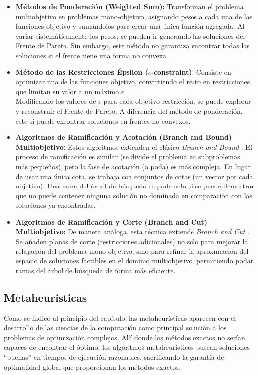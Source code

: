 \documentclass[12pt,a4paper]{book}
\begin{document}
\begin{itemize}
    \item \textbf{Métodos de Ponderación (Weighted Sum):} Transforman el problema multiobjetivo en problemas mono-objetivo, asignando pesos a cada una de las funciones objetivo y sumándolos para crear una única función agregada. Al variar sistemáticamente los pesos, se pueden ir generando las soluciones del Frente de Pareto. Sin embargo, este método no garantiza encontrar todas las soluciones si el frente tiene una forma no convexa.

    \item \textbf{Método de las Restricciones Épsilon ($\epsilon$-constraint):} Consiste en optimizar una de las funciones objetivo, convirtiendo el resto en restricciones que limitan su valor a un máximo $\epsilon$.\\
    Modificando los valores de $\epsilon$ para cada objetivo-restricción, se puede explorar y reconstruir el Frente de Pareto. A diferencia del método de ponderación, este sí puede encontrar soluciones en frentes no convexos.

    \item \textbf{Algoritmos de Ramificación y Acotación (Branch and Bound) Multiobjetivo:} Estos algoritmos extienden el clásico \textit{Branch and Bound} \cite{bnb}. El proceso de ramificación es similar (se divide el problema en subproblemas más pequeños), pero la fase de acotación (o poda) es más compleja. En lugar de usar una única cota, se trabaja con conjuntos de cotas (un vector por cada objetivo). Una rama del árbol de búsqueda se poda solo si se puede demostrar que no puede contener ninguna solución no dominada en comparación con las soluciones ya encontradas.

    \item \textbf{Algoritmos de Ramificación y Corte (Branch and Cut) Multiobjetivo:} De manera análoga, esta técnica extiende \textit{Branch and Cut} \cite{bnc}. Se añaden planos de corte (restricciones adicionales) no solo para mejorar la relajación del problema mono-objetivo, sino para refinar la aproximación del espacio de soluciones factibles en el dominio multiobjetivo, permitiendo podar ramas del árbol de búsqueda de forma más eficiente.
\end{itemize}

\subsection{Metaheurísticas}
Como se indicó al principio del capítulo, las metaheurísticas \cite{metaheuristicos} aparecen con el desarrollo de las ciencias de la computación como principal solución a los problemas de optimización complejos. Allí donde los métodos exactos no serían capaces de encontrar el óptimo,
los algoritmos metaheurísticos buscan soluciones ``buenas'' en tiempos de ejecución razonables, sacrificando la garantía de optimalidad global que proporcionan los métodos exactos.
\end{document}
